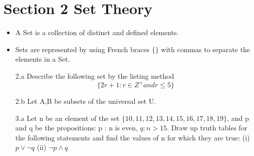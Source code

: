 









\section{Section 2 Set Theory}

\begin{itemize}
\item A Set is a collection of distinct and defined elements. 
\item Sets are represented by using French braces $\{ \}$ with commas to separate the elements in a Set. 
\end{itemize}



\begin{itemize}
\item[2.a] Describe the following set by the listing method
\[ \{ 2r+1 : r \in Z^{+} and r \leq 5  \} \]
\item[2.b] Let A,B be subsets of the universal set U.


\end{itemize}
\begin{itemize}
\item[3.a]
Let n be an element of the set $\{10, 11, 12, 13, 14, 15, 16, 17, 18, 19\}$,
and p and q be the propositions:
p : n is even, $q : n > 15$.
Draw up truth tables for the following statements and find the values of n for
which they are true:
(i) $p \vee \neg q$
(ii) $\neg p \wedge q$
\end{itemize}



